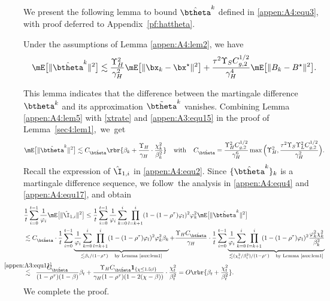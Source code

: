We present the following lemma to bound $\hat{\btheta}^k$ defined in \eqref{appen:A4:equ3}, with proof deferred to Appendix~\ref{pf:hattheta}. 

\begin{lemma}\label{appen:A4:lem5}
Under the assumptions of Lemma \ref{appen:A4:lem2}, we have
\begin{equation*}       
\mE\big[\|\hat{\btheta}^k\|^2\big] \lesssim \frac{\Upsilon_H^2}{\gamma_H^2} \mE\big[\|\bx_k-\bx^\star\|^2\big] + \frac{\tau^2\Upsilon_{S}C_{g,2}^{1/2}}{\gamma_H^4}\mE\big[\|B_k-B^\star\|^2\big].
\end{equation*}
\end{lemma}


This lemma indicates that the difference between the martingale difference $\btheta^k$ and its approximation $\tilde{\btheta}^k$ vanishes. Combining Lemma \ref{appen:A4:lem5} with \eqref{xtrate} and \eqref{appen:A3:equ15} in the proof of Lemma~\ref{sec4:lem1},~we~get 
\begin{equation}\label{appen:A4:equ18}
\mE\big[\|\hat{\btheta}^k\|^2\big]\lesssim C_{\hat{\btheta}}\rbr{ \beta_k + \frac{\Upsilon_H}{\gamma_H}\cdot \frac{\chi_k^2}{\beta_k^2}} \;\;\;\;\text{with}\;\;\;\; C_{\hat{\btheta}} = \frac{\Upsilon_H^2 C_{g,2}^{1/2}}{\gamma_H^6}\max\Big(\Upsilon_H^2, \frac{\tau^2\Upsilon_S\Upsilon_L^2C_{g,2}^{1/2}}{\gamma_H^2}\Big).
\end{equation}
Recall the expression of $\hat{\I}_{1,i}$ in \eqref{appen:A4:equ2}. Since $\{\hat{\btheta}^k\}_k$ is a martingale difference sequence, we follow~the analysis in \eqref{appen:A4:equ4} and \eqref{appen:A4:equ17}, and obtain
\begin{align}\label{appen:A4:equ21}
&\frac{1}{t}\sum_{i=0}^{t-1} \frac{1}{\varphi_i} \mE\big[\|\hat{\I}_{1,i}\|^2\big] \leq \frac{1}{t}\sum_{i=0}^{t-1} \frac{1}{\varphi_i}\sum_{k=0}^i \prod_{l=k+1}^i (1-(1-\rho^{\tau}) \varphi_l)^2\varphi_k^2 \mE\big[\|\hat{\btheta}^k\|^2\big]\nonumber\\
&\lesssim C_{\hat{\btheta}}\cdot \frac{1}{t}\sum_{i=0}^{t-1}\underbrace{\frac{1}{\varphi_i}\sum_{k=0}^i\prod_{l=k+1}^i(1-(1-\rho^{\tau})\varphi_l)^2 \varphi_k^2\beta_k}_{\lesssim \beta_i/(1-\rho^\tau)\quad\text{by Lemma \ref{aux:lem1}}} + \frac{\Upsilon_H C_{\hat{\btheta}}}{\gamma_H}\cdot \frac{1}{t}\sum_{i=0}^{t-1}\underbrace{\frac{1}{\varphi_i}\sum_{k=0}^i\prod_{l=k+1}^i(1-(1-\rho^{\tau})\varphi_l)^2 \frac{\varphi_k^2\chi_k^2}{\beta_k^2}}_{\lesssim (\chi_i^2/\beta_i^2)/(1-\rho^\tau)\quad\text{by Lemma \ref{aux:lem1}}}\nonumber\\
&\stackrel{\mathclap{\eqref{appen:A3:equ11}}}{\lesssim}\;\; \frac{C_{\hat{\btheta}}}{(1-\rho^\tau)(1-\beta)}\beta_t + \frac{\Upsilon_H C_{\hat{\btheta}}\mathbf{1}_{\{\chi\leq 1.5\beta\}}}{\gamma_H(1-\rho^\tau)(1-2(\chi-\beta))}\cdot\frac{\chi_t^2}{\beta_t^2} = O\rbr{\beta_t + \frac{\chi_t^2}{\beta_t^2}}.
\end{align}    
We complete the proof.




